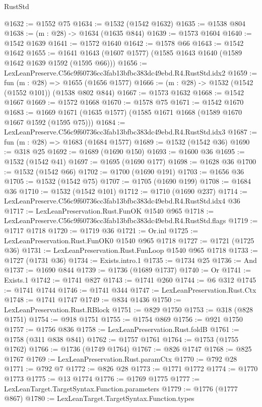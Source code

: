 \begin{lexlean}{RustStd}
\begin{coremodule}
@1632 := @1552 @75
@1634 := @1532 (@1542 @1632)
@1635 := @1538 @804
@1638 := (m : @28) -> @1634 (@1635 @844)
@1639 := @1573 @1604
@1640 := @1542 @1639
@1641 := @1572 @1640
@1642 := @1578 @66
@1643 := @1542 @1642
@1655 := @1641 @1643 (@1607 @1577) (@1585 @1643 @1640 (@1589 @1642 @1639 @1592 (@1595 @66)))
@1656 := LexLeanPreserve.C56c9f60736cc3fab13bfbc383dc49ebd.R4.RustStd.idx2
@1659 := fun (m : @28) => @1655 (@1656 @1577)
@1666 := (m : @28) -> @1532 (@1542 (@1552 @101)) (@1538 @802 @844)
@1667 := @1573 @1632
@1668 := @1542 @1667
@1669 := @1572 @1668
@1670 := @1578 @75
@1671 := @1542 @1670
@1683 := @1669 @1671 (@1635 @1577) (@1585 @1671 @1668 (@1589 @1670 @1667 @1592 (@1595 @75)))
@1684 := LexLeanPreserve.C56c9f60736cc3fab13bfbc383dc49ebd.R4.RustStd.idx3
@1687 := fun (m : @28) => @1683 (@1684 @1577)
@1689 := @1532 (@1542 @36)
@1690 := @318 @25
@1692 := @1689 (@1690 @150)
@1693 := @1600 @36
@1695 := @1532 (@1542 @41)
@1697 := @1695 (@1690 @177)
@1698 := @1628 @36
@1700 := @1532 (@1542 @66)
@1702 := @1700 (@1690 @191)
@1703 := @1656 @36
@1705 := @1532 (@1542 @75)
@1707 := @1705 (@1690 @199)
@1708 := @1684 @36
@1710 := @1532 (@1542 @101)
@1712 := @1710 (@1690 @237)
@1714 := LexLeanPreserve.C56c9f60736cc3fab13bfbc383dc49ebd.R4.RustStd.idx4 @36
@1717 := LexLeanPreservation.Rust.FunOK @1540 @965
@1718 := LexLeanPreserve.C56c9f60736cc3fab13bfbc383dc49ebd.R4.RustStd.flags
@1719 := @1717 @1718
@1720 := @1719 @36
@1721 := Or.inl
@1725 := LexLeanPreservation.Rust.FunOK0 @1540 @965 @1718
@1727 := @1721 (@1725 @36)
@1731 := LexLeanPreservation.Rust.FunLoop @1540 @965 @1718
@1733 := @1727 (@1731 @36)
@1734 := Exists.intro.{1}
@1735 := @1734 @25
@1736 := And
@1737 := @1690 @844
@1739 := @1736 (@1689 @1737)
@1740 := Or
@1741 := Exists.{1}
@1742 := @1741 @827
@1743 := @1741 @260
@1744 := @6 @312
@1745 := @1741 @1744
@1746 := @1741 @344
@1747 := LexLeanPreservation.Rust.Ctx
@1748 := @1741 @1747
@1749 := @834 @1436
@1750 := LexLeanPreservation.Rust.RBlock
@1751 := @829 @1750
@1753 := @318 (@828 @1751)
@1754 := @918 @1751
@1755 := @1754 @869
@1756 := @921 @1750
@1757 := @1756 @836
@1758 := LexLeanPreservation.Rust.foldB
@1761 := @1758 (@311 @838 @841)
@1762 := @1757 @1761
@1764 := @1753 (@1755 @1762)
@1766 := @1736 (@1749 @1764)
@1767 := @826 @1747
@1768 := @825 @1767
@1769 := LexLeanPreservation.Rust.paramCtx
@1770 := @792 @28
@1771 := @792 @7
@1772 := @826 @28
@1773 := @1771 @1772
@1774 := @1770 @1773
@1775 := @13 @1774
@1776 := @1769 @1775
@1777 := LexLeanTarget.TargetSyntax.Function.parameters
@1779 := @1776 (@1777 @867)
@1780 := LexLeanTarget.TargetSyntax.Function.types

\end{coremodule}
\end{lexlean}
